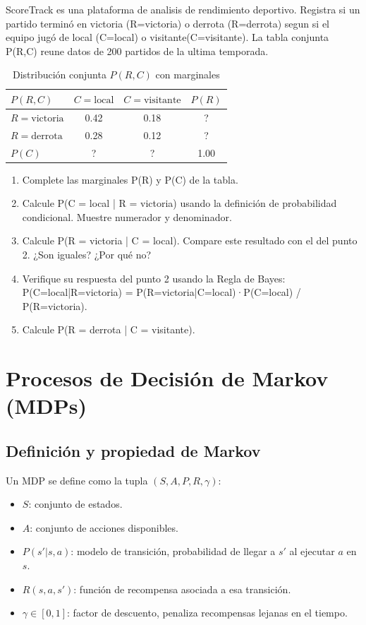 ScoreTrack es una plataforma de analisis de rendimiento deportivo. Registra si un partido terminó en victoria (R=victoria)
o derrota (R=derrota) segun si el equipo jugó de local (C=local) o visitante(C=visitante). La tabla conjunta P(R,C) reune datos de 200 partidos de la ultima temporada.

\begin{table}[H]
    \centering
    \begin{tabular}{lccc}
        \toprule
        $P(R,C)$ & $C=\text{local}$ & $C=\text{visitante}$ & $P(R)$ \\
        \midrule
        $R=\text{victoria}$ & 0.42 & 0.18 & ? \\
        $R=\text{derrota}$  & 0.28 & 0.12 & ? \\
        \midrule
        $P(C)$ & ? & ? & 1.00 \\
        \bottomrule
    \end{tabular}
    \caption{Distribución conjunta $P(R,C)$ con marginales}
\end{table}


\begin{enumerate}
    \item Complete las marginales P(R) y P(C) de la tabla.
    \item Calcule P(C = local | R = victoria) usando la definición de probabilidad condicional. Muestre numerador y denominador.
    \item Calcule P(R = victoria | C = local). Compare este resultado con el del punto 2. ¿Son iguales? ¿Por qué no?
    \item Verifique su respuesta del punto 2 usando la Regla de Bayes: P(C=local|R=victoria) = P(R=victoria|C=local)·P(C=local) / P(R=victoria).
    \item Calcule P(R = derrota | C = visitante).
\end{enumerate}

\section{Procesos de Decisión de Markov (MDPs)}

\subsection{Definición y propiedad de Markov}

\begin{definition}[MDP]
    Un MDP se define como la tupla $(S, A, P, R, \gamma)$:
    \begin{itemize}
        \item $S$: conjunto de estados.
        \item $A$: conjunto de acciones disponibles.
        \item $P(s'|s,a)$: modelo de transición, probabilidad de llegar a $s'$ al ejecutar $a$ en $s$.
        \item $R(s,a,s')$: función de recompensa asociada a esa transición.
        \item $\gamma \in [0,1]$: factor de descuento, penaliza recompensas lejanas en el tiempo.
    \end{itemize}
\end{definition}

